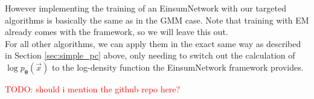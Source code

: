 However implementing the training of an EinsumNetwork with our targeted algorithms is basically the same 
as in the GMM case. Note that training with EM already comes with the framework, so we will leave this out. \\
For all other algorithms, we can apply them in the exact same way as described in Section \ref{sec:simple_pc} above, only needing 
to switch out the calculation of $\log p_{\boldsymbol{\theta}}(\vec x)$ to the log-density function the EinsumNetwork framework provides. 

\textcolor{red}{TODO: should i mention the github repo here?}
